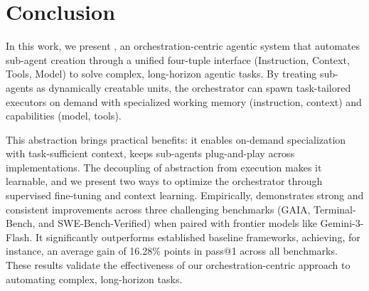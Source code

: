 \section{Conclusion}
In this work, we present \our{}, an orchestration-centric agentic system that automates sub-agent creation through a unified four-tuple interface (Instruction, Context, Tools, Model) to solve complex, long-horizon agentic tasks. By treating sub-agents as dynamically creatable units, the orchestrator can spawn task-tailored executors on demand with specialized working memory (instruction, context) and capabilities (model, tools). 

This abstraction brings practical benefits: it enables on-demand specialization with task-sufficient context, keeps sub-agents plug-and-play across implementations.
The decoupling of abstraction from execution makes it learnable, and we present two ways to optimize the orchestrator through supervised fine-tuning and context learning. 
Empirically, \our{} demonstrates strong and consistent improvements across three challenging benchmarks (GAIA, Terminal-Bench, and SWE-Bench-Verified) when paired with frontier models like Gemini-3-Flash. It significantly outperforms established baseline frameworks, achieving, for instance, an average gain of 16.28\% points in pass@1 across all benchmarks. These results validate the effectiveness of our orchestration-centric approach to automating complex, long-horizon tasks.
